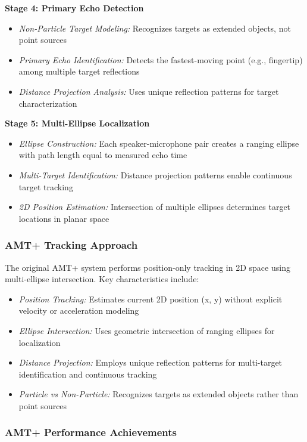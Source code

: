 \documentclass[a4paper]{article}
\begin{document}
{\bf Stage 4: Primary Echo Detection}
\begin{itemize}
\item {\em Non-Particle Target Modeling:} Recognizes targets as extended objects, not point sources
\item {\em Primary Echo Identification:} Detects the fastest-moving point (e.g., fingertip) among multiple target reflections
\item {\em Distance Projection Analysis:} Uses unique reflection patterns for target characterization
\end{itemize}

{\bf Stage 5: Multi-Ellipse Localization}
\begin{itemize}
\item {\em Ellipse Construction:} Each speaker-microphone pair creates a ranging ellipse with path length equal to measured echo time
\item {\em Multi-Target Identification:} Distance projection patterns enable continuous target tracking
\item {\em 2D Position Estimation:} Intersection of multiple ellipses determines target locations in planar space
\end{itemize}

\subsubsection{AMT+ Tracking Approach}

The original AMT+ system performs position-only tracking in 2D space using multi-ellipse intersection. Key characteristics include:

\begin{itemize}
\item {\em Position Tracking:} Estimates current 2D position (x, y) without explicit velocity or acceleration modeling
\item {\em Ellipse Intersection:} Uses geometric intersection of ranging ellipses for localization
\item {\em Distance Projection:} Employs unique reflection patterns for multi-target identification and continuous tracking
\item {\em Particle vs Non-Particle:} Recognizes targets as extended objects rather than point sources
\end{itemize}

\subsubsection{AMT+ Performance Achievements}
\end{document}
